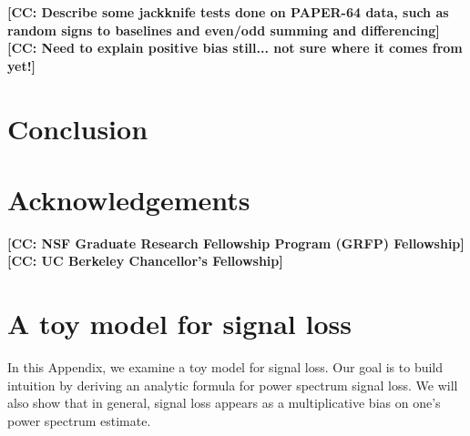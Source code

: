 \documentclass[preprint2,numberedappendix,tighten]{aastex6}  %
\newcommand{\cc}[1]{{\color{purple} \textbf{[CC: #1]}}}
\begin{document}
\cc{Describe some jackknife tests done on PAPER-64 data, such as random signs to baselines and even/odd summing and differencing} \\
\cc{Need to explain positive bias still... not sure where it comes from yet!}

\section{Conclusion}
\label{sec:Con}

\section{Acknowledgements}
\cc{NSF Graduate Research Fellowship Program (GRFP) Fellowship}
\cc{UC Berkeley Chancellor's Fellowship}
\label{sec:Ack}

\appendix
\section{A toy model for signal loss}
\label{sec:sigloss_appendix}

In this Appendix, we examine a toy model for signal loss. Our goal is to build intuition by deriving an analytic formula for power spectrum signal loss. We will also show that in general, signal loss appears as a multiplicative bias on one's power spectrum estimate.
\end{document}
